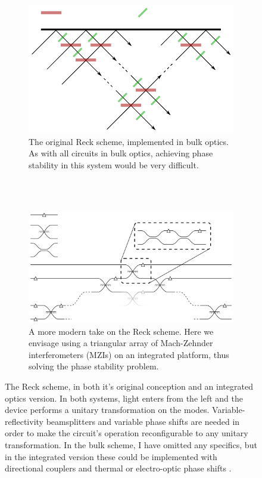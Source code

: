 \begin{figure}
  \begin{subfigure}{\textwidth}
    \centering
    \includegraphics{figures/reck_original}
    \caption{The original Reck scheme, implemented in bulk optics. As with all
    circuits in bulk optics, achieving phase stability in this system would be
    very difficult.}
    \label{fig:ReckOriginal}
  \end{subfigure} \\
  \vspace{1cm} \\
  \begin{subfigure}{\textwidth}
    \centering
    \includegraphics{figures/reck_general}
    \caption{A more modern take on the Reck scheme. Here we envisage using
    a triangular array of
    Mach-Zehnder interferometers (MZIs) on an integrated platform, thus solving
    the phase stability problem.}
    \label{fig:ReckGeneral}
  \end{subfigure}
  \caption[The Reck scheme, in both it's original conception and an integrated
  optics version]{The Reck scheme, in both it's original conception and an
  integrated
  optics version. In both systems, light enters from the left and the device
  performs a unitary transformation on the modes. Variable-reflectivity
  beamsplitters and variable phase shifts are needed in order to make the
  circuit's operation reconfigurable to any unitary transformation. In the
  bulk scheme, I have omitted any specifics, but in the integrated version these
  could be implemented with directional couplers and thermal or electro-optic
  phase shifts .}
  \label{fig:ReckScheme}
\end{figure}

